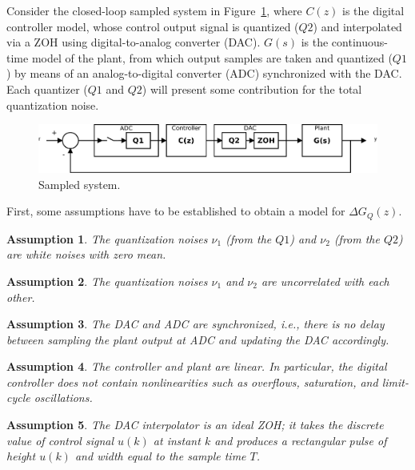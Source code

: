 \documentclass{sig-alternate-05-2015}
\newtheorem{myassumption}{Assumption}
\begin{document}
Consider the closed-loop sampled system in Figure~\ref{fig:sampledsystem}, where $C(z)$ is the digital controller model, whose control output signal is quantized ($Q2$) and interpolated via a ZOH using digital-to-analog converter (DAC). $G(s)$ is the continuous-time model of the plant, from which output samples are taken and quantized ($Q1$) by means of an analog-to-digital converter (ADC) synchronized with the DAC. Each quantizer ($Q1$ and $Q2$) will present some contribution for the total quantization noise.
%
\begin{figure}[ht]
\centering
\includegraphics[width=\columnwidth]{figures/hsystembd.pdf}
\caption{Sampled system.}
\label{fig:sampledsystem}
\end{figure}

First, some assumptions have to be established to obtain a model for $\Delta{G_{Q}(z)}$.
%
\begin{myassumption}
\label{whitenoise}
The quantization noises $\nu_{1}$ (from the $Q1$) and $\nu_{2}$ (from the $Q2$) are white noises with zero mean.
\end{myassumption}

\begin{myassumption}
The quantization noises $\nu_{1}$ and $\nu_{2}$ are uncorrelated with each other.
\end{myassumption}

\begin{myassumption}
The DAC and ADC are synchronized, {\it i.e.}, there is no delay between sampling the plant output at ADC and updating the DAC accordingly.
\end{myassumption}

\begin{myassumption}
The controller and plant are linear. In particular, the digital controller does not contain nonlinearities such as overflows, saturation, and limit-cycle oscillations.
\end{myassumption}

\begin{myassumption}
The DAC interpolator is an ideal ZOH; it takes the discrete value of control signal $u(k)$ at instant $k$ and produces a rectangular pulse of height $u(k)$ and width equal to the sample time $T$.
\end{myassumption}
\end{document}
